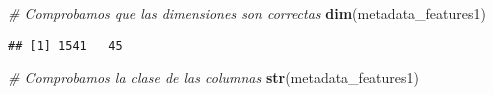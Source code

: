 \documentclass[
]{article}
\newenvironment{Shaded}{\begin{snugshade}}{\end{snugshade}}
\newcommand{\CommentTok}[1]{\textcolor[rgb]{0.56,0.35,0.01}{\textit{#1}}}
\newcommand{\FunctionTok}[1]{\textcolor[rgb]{0.13,0.29,0.53}{\textbf{#1}}}
\newcommand{\NormalTok}[1]{#1}
\begin{document}
\begin{Shaded}
\begin{Highlighting}[]
\CommentTok{\# Comprobamos que las dimensiones son correctas}
\FunctionTok{dim}\NormalTok{(metadata\_features1)}
\end{Highlighting}
\end{Shaded}

\begin{verbatim}
## [1] 1541   45
\end{verbatim}

\begin{Shaded}
\begin{Highlighting}[]
\CommentTok{\# Comprobamos la clase de las columnas}
\FunctionTok{str}\NormalTok{(metadata\_features1)}
\end{Highlighting}
\end{Shaded}
\end{document}
